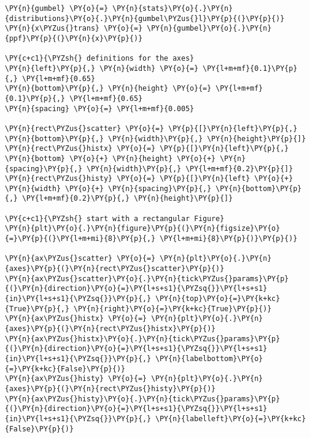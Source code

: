     \begin{tcolorbox}[breakable, size=fbox, boxrule=1pt, pad at break*=1mm,colback=cellbackground, colframe=cellborder]
\begin{Verbatim}[commandchars=\\\{\}]
\PY{n}{gumbel} \PY{o}{=} \PY{n}{stats}\PY{o}{.}\PY{n}{distributions}\PY{o}{.}\PY{n}{gumbel\PYZus{}l}\PY{p}{(}\PY{p}{)}
\PY{n}{x\PYZus{}trans} \PY{o}{=} \PY{n}{gumbel}\PY{o}{.}\PY{n}{ppf}\PY{p}{(}\PY{n}{x}\PY{p}{)}

\PY{c+c1}{\PYZsh{} definitions for the axes}
\PY{n}{left}\PY{p}{,} \PY{n}{width} \PY{o}{=} \PY{l+m+mf}{0.1}\PY{p}{,} \PY{l+m+mf}{0.65}
\PY{n}{bottom}\PY{p}{,} \PY{n}{height} \PY{o}{=} \PY{l+m+mf}{0.1}\PY{p}{,} \PY{l+m+mf}{0.65}
\PY{n}{spacing} \PY{o}{=} \PY{l+m+mf}{0.005}

\PY{n}{rect\PYZus{}scatter} \PY{o}{=} \PY{p}{[}\PY{n}{left}\PY{p}{,} \PY{n}{bottom}\PY{p}{,} \PY{n}{width}\PY{p}{,} \PY{n}{height}\PY{p}{]}
\PY{n}{rect\PYZus{}histx} \PY{o}{=} \PY{p}{[}\PY{n}{left}\PY{p}{,} \PY{n}{bottom} \PY{o}{+} \PY{n}{height} \PY{o}{+} \PY{n}{spacing}\PY{p}{,} \PY{n}{width}\PY{p}{,} \PY{l+m+mf}{0.2}\PY{p}{]}
\PY{n}{rect\PYZus{}histy} \PY{o}{=} \PY{p}{[}\PY{n}{left} \PY{o}{+} \PY{n}{width} \PY{o}{+} \PY{n}{spacing}\PY{p}{,} \PY{n}{bottom}\PY{p}{,} \PY{l+m+mf}{0.2}\PY{p}{,} \PY{n}{height}\PY{p}{]}

\PY{c+c1}{\PYZsh{} start with a rectangular Figure}
\PY{n}{plt}\PY{o}{.}\PY{n}{figure}\PY{p}{(}\PY{n}{figsize}\PY{o}{=}\PY{p}{(}\PY{l+m+mi}{8}\PY{p}{,} \PY{l+m+mi}{8}\PY{p}{)}\PY{p}{)}

\PY{n}{ax\PYZus{}scatter} \PY{o}{=} \PY{n}{plt}\PY{o}{.}\PY{n}{axes}\PY{p}{(}\PY{n}{rect\PYZus{}scatter}\PY{p}{)}
\PY{n}{ax\PYZus{}scatter}\PY{o}{.}\PY{n}{tick\PYZus{}params}\PY{p}{(}\PY{n}{direction}\PY{o}{=}\PY{l+s+s1}{\PYZsq{}}\PY{l+s+s1}{in}\PY{l+s+s1}{\PYZsq{}}\PY{p}{,} \PY{n}{top}\PY{o}{=}\PY{k+kc}{True}\PY{p}{,} \PY{n}{right}\PY{o}{=}\PY{k+kc}{True}\PY{p}{)}
\PY{n}{ax\PYZus{}histx} \PY{o}{=} \PY{n}{plt}\PY{o}{.}\PY{n}{axes}\PY{p}{(}\PY{n}{rect\PYZus{}histx}\PY{p}{)}
\PY{n}{ax\PYZus{}histx}\PY{o}{.}\PY{n}{tick\PYZus{}params}\PY{p}{(}\PY{n}{direction}\PY{o}{=}\PY{l+s+s1}{\PYZsq{}}\PY{l+s+s1}{in}\PY{l+s+s1}{\PYZsq{}}\PY{p}{,} \PY{n}{labelbottom}\PY{o}{=}\PY{k+kc}{False}\PY{p}{)}
\PY{n}{ax\PYZus{}histy} \PY{o}{=} \PY{n}{plt}\PY{o}{.}\PY{n}{axes}\PY{p}{(}\PY{n}{rect\PYZus{}histy}\PY{p}{)}
\PY{n}{ax\PYZus{}histy}\PY{o}{.}\PY{n}{tick\PYZus{}params}\PY{p}{(}\PY{n}{direction}\PY{o}{=}\PY{l+s+s1}{\PYZsq{}}\PY{l+s+s1}{in}\PY{l+s+s1}{\PYZsq{}}\PY{p}{,} \PY{n}{labelleft}\PY{o}{=}\PY{k+kc}{False}\PY{p}{)}


\end{Verbatim}
\end{tcolorbox}
